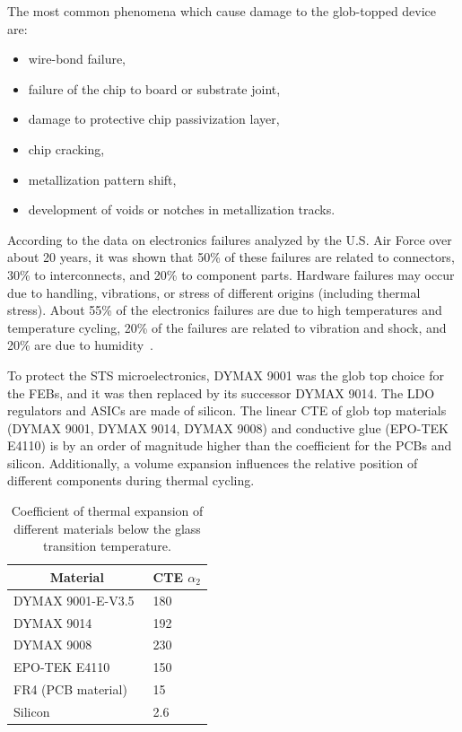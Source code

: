 The most common phenomena which cause damage to the glob-topped device are:
\begin{itemize}
    \item wire-bond failure,
    \item failure of the chip to board or substrate joint,
    \item damage to protective chip passivization layer,
    \item chip cracking,
    \item metallization pattern shift,
    \item development of voids or notches in metallization tracks. 
\end{itemize}


According to the data on electronics failures analyzed by the U.S. Air Force over about 20 years, it was shown that 50\% of these failures are related to connectors, 30\% to interconnects, and 20\% to component
parts. Hardware failures may occur due to handling, vibrations, or stress of different origins (including thermal stress). About 55\% of the electronics failures are due to high temperatures and temperature cycling, 20\% of the failures are related to vibration and shock, and 20\% are due to humidity~\cite{thermal_electronics}. 

To protect the STS microelectronics, DYMAX 9001 was the glob top choice for the \glspl{FEB}, and it was then replaced by its successor DYMAX 9014. The \gls{LDO} regulators and \glspl{ASIC} are made of silicon. The linear CTE of glob top materials (DYMAX 9001, DYMAX 9014, DYMAX 9008) and conductive glue (EPO-TEK E4110) is by an order of magnitude higher than the coefficient for the \glspl{PCB} and silicon. Additionally, a volume expansion influences the relative position of different components during thermal cycling.

\begin{table}[!h]
\begin{center}
\caption{Coefficient of thermal expansion of different materials below the glass transition temperature.}
\begin{tabular}{ll}
\hline
\multicolumn{1}{c}{Material} & \multicolumn{1}{c}{CTE $\alpha_{2}$} [\si{\micro\metre\per\metre\per\celsius]}] \\ \hline
DYMAX 9001-E-V3.5~\cite{9001}            & 180                                  \\
DYMAX 9014~\cite{9014}                   & 192                                  \\
DYMAX 9008~\cite{9008}                   & 230                                  \\
EPO-TEK E4110~\cite{4110}                & 150                                  \\ \hline
FR4 (\gls{PCB} material)~\cite{FR4}                          & 15                                   \\
Silicon~\cite{Si}                           & 2.6                                 
\end{tabular}
\label{TCE}
\end{center}
\end{table}

